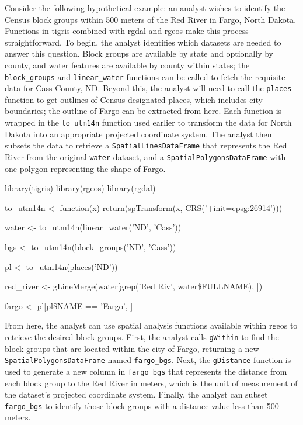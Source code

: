 Consider the following hypothetical example: an analyst wishes to
identify the Census block groups within 500 meters of the Red River in
Fargo, North Dakota. Functions in tigris combined with rgdal and rgeos
make this process straightforward. To begin, the analyst identifies
which datasets are needed to answer this question. Block groups are
available by state and optionally by county, and water features are
available by county within states; the \texttt{block\_groups} and
\texttt{linear\_water} functions can be called to fetch the requisite
data for Cass County, ND. Beyond this, the analyst will need to call the
\texttt{places} function to get outlines of Census-designated places,
which includes city boundaries; the outline of Fargo can be extracted
from here. Each function is wrapped in the \texttt{to\_utm14n} function
used earlier to transform the data for North Dakota into an appropriate
projected coordinate system. The analyst then subsets the data to
retrieve a \texttt{SpatialLinesDataFrame} that represents the Red River
from the original \texttt{water} dataset, and a
\texttt{SpatialPolygonsDataFrame} with one polygon representing the
shape of Fargo.

\begin{Schunk}
\begin{Sinput}
library(tigris)
library(rgeos)
library(rgdal)

to_utm14n <- function(x) {
  return(spTransform(x, CRS('+init=epsg:26914')))
} 
 
water <- to_utm14n(linear_water('ND', 'Cass'))

bgs <- to_utm14n(block_groups('ND', 'Cass'))

pl <- to_utm14n(places('ND'))

red_river <- gLineMerge(water[grep('Red Riv', water\$FULLNAME), ]) 

fargo <- pl[pl\$NAME == 'Fargo', ]
\end{Sinput}
\end{Schunk}

From here, the analyst can use spatial analysis functions available
within rgeos to retrieve the desired block groups. First, the analyst
calls \texttt{gWithin} to find the block groups that are located within
the city of Fargo, returning a new \texttt{SpatialPolygonsDataFrame}
named \texttt{fargo\_bgs}. Next, the \texttt{gDistance} function is used
to generate a new column in \texttt{fargo\_bgs} that represents the
distance from each block group to the Red River in meters, which is the
unit of measurement of the dataset's projected coordinate system.
Finally, the analyst can subset \texttt{fargo\_bgs} to identify those
block groups with a distance value less than 500 meters.

